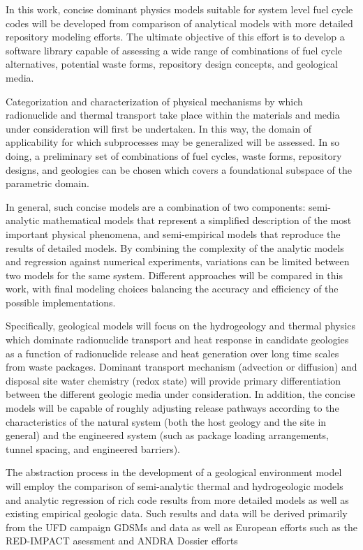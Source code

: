 In this work, concise dominant physics models suitable for system 
level fuel cycle codes will be developed from comparison of analytical 
models with more detailed repository modeling efforts. The ultimate 
objective of this effort is to develop a software library capable of 
assessing a wide range of combinations of fuel cycle alternatives, 
potential waste forms, repository design concepts, and geological 
media. 

Categorization and characterization of physical mechanisms by which 
radionuclide and thermal transport take place within the materials and 
media under consideration will first be undertaken. In this way, the 
domain of applicability for which subprocesses may be generalized will 
be assessed. In so doing, a preliminary set of combinations of fuel 
cycles, waste forms, repository designs, and geologies can be chosen 
which covers a foundational subspace of the parametric domain. 

In general, such concise models are a combination of two components: 
semi-analytic mathematical models that represent a simplified 
description of the most important physical phenomena, and 
semi-empirical models that reproduce the results of detailed models.  
By combining the complexity of the analytic models and regression 
against numerical experiments, variations can be limited between two 
models for the same system.  Different approaches will be compared in 
this work, with final modeling choices balancing the accuracy and 
efficiency of the possible implementations.  

Specifically, geological models will focus on the hydrogeology and 
thermal physics which dominate radionuclide transport and heat response in 
candidate geologies as a function of radionuclide release and heat 
generation over long time scales from waste packages.  Dominant 
transport mechanism (advection or diffusion) and disposal site water 
chemistry (redox state) will provide primary differentiation between 
the different geologic media under consideration. In addition, the 
concise models will be capable of roughly adjusting release pathways 
according to the characteristics of the natural system (both the host 
geology and the site in general) and the engineered system (such as 
package loading arrangements, tunnel spacing, and engineered 
barriers).

The abstraction process in the development of a geological environment 
model will employ the comparison of semi-analytic thermal and 
hydrogeologic models and analytic regression of rich code results from more 
detailed models as well as existing empirical geologic data. Such results and 
data will be derived primarily from the \gls{UFD} campaign \glspl{GDSM} and  
data as well as European efforts such as the \gls{RED-IMPACT} asessment 
and \gls{ANDRA} Dossier efforts 

